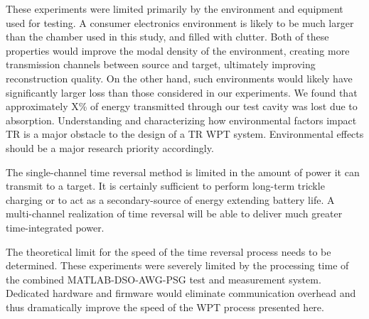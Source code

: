 These experiments were limited primarily by the environment and equipment used
for testing.
%
A consumer electronics environment is likely to be much larger than the chamber
used in this study, and filled with clutter.
%
Both of these properties would improve the modal density of the environment,
creating more transmission channels between source and target, ultimately
improving reconstruction quality.
%
On the other hand, such environments would likely have significantly larger loss
than those considered in our experiments. We found that approximately X\% of energy  transmitted through our test cavity was lost due to absorption. Understanding and characterizing how environmental factors impact TR is a major obstacle to the design of a TR WPT system. Environmental effects should be a major research priority accordingly.


The single-channel time reversal method is limited in the amount of power it can
transmit to a target.
%
It is certainly sufficient to perform long-term trickle charging or to act as a
secondary-source of energy extending battery life.
%
A multi-channel realization of time reversal will be able to deliver much
greater time-integrated power.



The theoretical limit for the speed of the time reversal process needs to be
determined.
%
These experiments were severely limited by the processing time of the combined
MATLAB-DSO-AWG-PSG test and measurement system.
%
Dedicated hardware and firmware would eliminate communication overhead and thus
dramatically improve the speed of the WPT process presented here.
